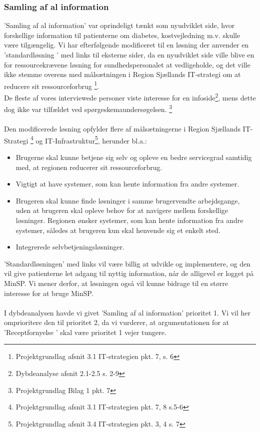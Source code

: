 \subsubsection{Samling af al information}
'Samling af al information' var oprindeligt tænkt som nyudviklet side, hvor forskellige information til patienterne om diabetes, kostvejledning m.v. skulle være tilgængelig. Vi har efterfølgende modificeret til en løsning der anvender en ’standardløsning ’ med links til eksterne sider, da en nyudviklet side ville blive en for ressourcekrævene løsning for sundhedspersonalet at vedligeholde, og det ville ikke stemme overens med målsætningen i Region Sjællands IT-strategi om at reducere sit ressourceforbrug \footnote{Projektgrundlag afsnit 3.1 IT-strategien pkt. 7, s. 6}.\\
De fleste af vores interviewede personer viste interesse for en infoside\footnote{Dybdeanalyse afsnit 2.1-2.5 s. 2-9}, mens dette dog ikke var tilfældet ved spørgeskemaundersøgelsen. \footnote{Projektgrundlag Bilag 1 pkt. 7}\\
\\
Den modificerede løsning opfylder flere af målsætningerne i Region Sjællands IT-Strategi \footnote{Projektgrundlag afsnit 3.1 IT-strategien pkt. 7, 8  s.5-6} og IT-Infrastruktur\footnote{Projektgrundlag afsnit 3.4 IT-strategien pkt. 3, 4 s. 7}, herunder bl.a.: 
\begin{itemize}
\item Brugerne skal kunne betjene sig selv og opleve en bedre servicegrad samtidig med, at regionen reducerer sit ressourceforbrug.
\item Vigtigt at have systemer, som kan hente information fra andre systemer. 
\item Brugeren skal kunne finde løsninger i samme brugervendte arbejdsgange, uden at brugeren skal opleve behov for at navigere mellem forskellige løsninger. Regionen ønsker systemer, som kan hente information fra andre systemer, således at brugeren kun skal henvende sig et enkelt sted.
\item Integrerede selvbetjeningsløsninger.
\end{itemize}
'Standardløsningen' med links vil være billig at udvikle og implementere, og den vil give patienterne let adgang til nyttig information, når de alligevel er logget på MinSP. Vi mener derfor, at løsningen også vil kunne bidrage til en større interesse for at bruge MinSP.\\
\\
I dybdeanalysen havde vi givet ’Samling af al information’ prioritet 1. Vi vil her omprioritere den til prioritet 2, da vi vurderer, at argumentationen for at ’Receptfornyelse ’ skal være prioritet 1 vejer tungere.
